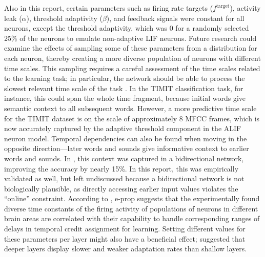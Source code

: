     Also in this report, certain parameters such as firing rate targets ($f^\text{target}$), activity leak ($\alpha$), threshold adaptivity ($\beta$), and feedback signals were constant for all neurons, except the threshold adaptivity, which was 0 for a randomly selected 25\% of the neurons to emulate non-adaptive LIF neurons.
    Future research could examine the effects of sampling some of these parameters from a distribution for each neuron, thereby creating a more diverse population of neurons with different time scales.
    This sampling requires a careful assessment of the time scales related to the learning task; in particular, the network should be able to process the slowest relevant time scale of the task \citep{jaeger2021dimensions}.
    In the TIMIT classification task, for instance, this could span the whole time fragment, because initial words give semantic context to all subsequent words.
    However, a more predictive time scale for the TIMIT dataset is on the scale of approximately 8 MFCC frames, which is now accurately captured by the adaptive threshold component in the ALIF neuron model.
    Temporal dependencies can also be found when moving in the opposite direction---later words and sounds give informative context to earlier words and sounds.
    In \citet{bellec2020solution}, this context was captured in a bidirectional network, improving the accuracy by nearly 15\%.
    In this report, this was empirically validated as well, but left undiscussed because a bidirectional network is not biologically plausible, as directly accessing earlier input values violates the ``online'' constraint.
    According to \citet{bellec2020solution}, e-prop suggests that the experimentally found diverse time constants of the firing activity of populations of neurons in different brain areas \citep{runyan2017distinct} are correlated with their capability to handle corresponding ranges of delays in temporal credit assignment for learning.
    Setting different values for these parameters per layer might also have a beneficial effect; \citet{ahmed1998estimates} suggested that deeper layers display slower and weaker adaptation rates than shallow layers.

